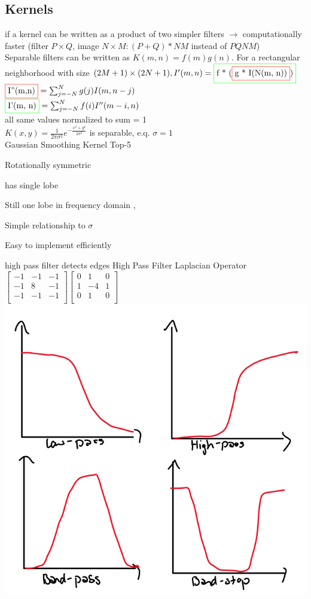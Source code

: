 \subsection*{Kernels}
 if a kernel can be written as a product of two simpler filters $\rightarrow$ computationally faster (filter $P \times Q$, image $N \times M: (P + Q) * NM$ instead of $PQNM$)\\
Separable filters can be written as \( K(m,n) = f(m)g(n) \).
For a rectangular neighborhood with size \((2M+1) \times (2N+1), I'(m, n) = \fcolorbox{green}{white}{f * (\fcolorbox{red}{white}{g * I(N(m, n))})}\)\\
$
\fcolorbox{red}{white}{I''(m,n)} = \sum_{j=-N}^{N} g(j) I(m, n - j)
$
\\
$\fcolorbox{green}{white}{I'(m, n)} = \sum_{j=-N}^{N} f(i) I''(m - i, n)$\\
 all same values normalized to sum = 1\\
 $K(x, y) = \frac{1}{2\pi \sigma^{2}} e^{-\frac{x^{2} + y^{2}}{2\sigma^{2}}}$ is separable, e.q. $\sigma = 1$\\
Gaussian Smoothing Kernel Top-5
\begin{compactitem}
\item Rotationally symmetric
\item has single lobe 
\item Still one lobe in frequency domain ,
\item Simple relationship to $\sigma$
\item Easy to implement efficiently
\end{compactitem}
high pass filter detects edges 
High Pass Filter Laplacian Operator \\
$
\begin{bmatrix}
        -1 & -1 & -1 \\
        -1 & 8 & -1 \\
        -1 & -1 & -1 \\
\end{bmatrix} 
$$
\begin{bmatrix}
        0 & 1 & 0 \\
        1 & -4 & 1 \\
        0 & 1 & 0 \\
\end{bmatrix} 
$
\includegraphics[width = 0.3 \columnwidth]{assets/jo/types-of-filters.png}

